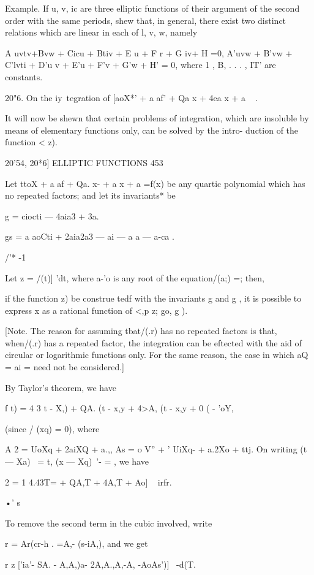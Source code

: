 {Example. If u, v, ic are three elliptic functions of their argument of
the second order with the same periods, shew that, in general, there
exist two distinct relations which are linear in each of l, v, w,
namely

A uvtv+Bvw + Cicu + Btiv + E u + F r + G iv+ H =0, A'uvw + B'vw +
C'lvti + D'u v + E'u + F'v + G'w + H' = 0, where 1 , B, . . . , IT'
are constants.

20"6. On the iy\ tegration of [aoX*' + a af' + Qa x + 4ea x + a ~ .

It will now be shewn that certain problems of integration, which are
insoluble by means of elementary functions only, can be solved by the
intro- duction of the function < z).

20'54, 20*6] ELLIPTIC FUNCTIONS 453

Let ttoX + a af + Qa. x- + a x + a =f(x) be any quartic polynomial
which has no repeated factors; and let its invariants* be

g = ciocti — 4aia3 + 3a.

gs = a aoCti + 2aia2a3 — ai — a a — a-ca .

/'* -1

Let z = /(t)] 'dt, where a-'o is any root of the equation/(a;) =;
then,

if the function z) be construe tedf with the invariants g and g , it
is possible to express x as a rational function of <,p z; go, g ).

[Note. The reason for assuming tbat/(.r) has no repeated factors is
that, when/(.r) has a repeated factor, the integration can be eftected
with the aid of circular or logarithmic functions only. For the same
reason, the case in which aQ = ai = need not be considered.]

By Taylor's theorem, we have

f t) = 4 3 t - X,) + QA. (t - x,y + 4>A, (t - x,y + 0 ( - 'oY,

(since / (xq) = 0), where

A 2 = UoXq + 2aiXQ + a.,, As = o V'' + ' UiXq- + a.2Xo + ttj. On
writing (t — Xa)~ = t, (x — Xq)~'- = , we have

2 = 1 4.43T= + QA,T + 4A,T + Ao] ~ irfr.

•' s

To remove the second term in the cubic involved, write

r = Ar(cr-h . =A,- (s-iA,), and we get

r z ['ia'- SA. - A,A,)a- 2A,A.,A,-A, -AoAs')]~ -d(T.

}
